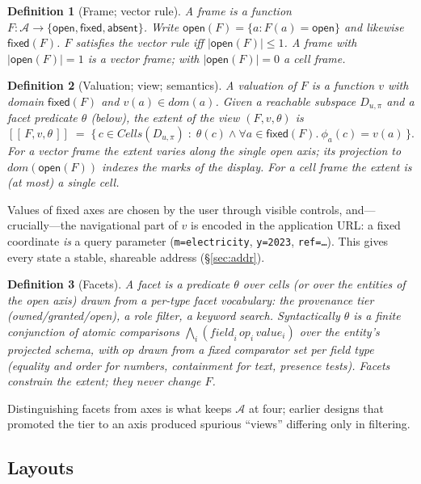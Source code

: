 \documentclass[11pt,a4paper]{article}
\newtheorem{definition}{Definition}[section]
\theoremstyle{remark}
\newcommand{\Ax}{\mathcal{A}}                    %
\newcommand{\Cells}{\mathit{Cells}}
\newcommand{\Dom}{\mathit{dom}}
\newcommand{\open}{\mathsf{open}}
\newcommand{\fixed}{\mathsf{fixed}}
\newcommand{\absent}{\mathsf{absent}}
\begin{document}
\begin{definition}[Frame; vector rule]\label{def:frame}
A \emph{frame} is a function $F : \Ax \to \{\open, \fixed, \absent\}$. Write
$\open(F) = \{a : F(a) = \open\}$ and likewise $\fixed(F)$. $F$ satisfies the
\emph{vector rule} iff $|\open(F)| \le 1$. A frame with $|\open(F)| = 1$ is a
\emph{vector frame}; with $|\open(F)| = 0$ a \emph{cell frame}.
\end{definition}

\begin{definition}[Valuation; view; semantics]\label{def:view}
A \emph{valuation} of $F$ is a function $v$ with domain $\fixed(F)$ and
$v(a) \in \Dom(a)$. Given a reachable subspace $D_{u,\pi}$ and a facet predicate
$\theta$ (below), the \emph{extent} of the view $(F, v, \theta)$ is
\[
[\![\, F, v, \theta \,]\!] \;=\;
\{\, c \in \Cells(D_{u,\pi}) \;:\; \theta(c) \wedge \forall a \in \fixed(F).\
\phi_a(c) = v(a) \,\}.
\]
For a vector frame the extent varies along the single open axis; its projection to
$\Dom(\open(F))$ indexes the \emph{marks} of the display. For a cell frame the
extent is (at most) a single cell.
\end{definition}

Values of fixed axes are chosen by the user through visible controls, and---
crucially---the navigational part of $v$ is encoded in the application URL: a fixed
coordinate \emph{is} a query parameter (\texttt{m=electricity}, \texttt{y=2023},
\texttt{ref=\ldots}). This gives every state a stable, shareable address
(\S\ref{sec:addr}).

\begin{definition}[Facets]\label{def:facets}
A \emph{facet} is a predicate $\theta$ over cells (or over the entities of the open
axis) drawn from a per-type facet vocabulary: the provenance tier
(owned/granted/open), a role filter, a keyword search. Syntactically $\theta$ is a
finite conjunction of atomic comparisons
$\bigwedge_i (\mathit{field}_i \,\mathit{op}_i\, \mathit{value}_i)$ over the
entity's projected schema, with $\mathit{op}$ drawn from a fixed comparator set
per field type (equality and order for numbers, containment for text, presence
tests). Facets constrain the extent; they never change $F$.
\end{definition}

Distinguishing facets from axes is what keeps $\Ax$ at four; earlier designs that
promoted the tier to an axis produced spurious ``views'' differing only in
filtering.

\subsection{Layouts}\label{sec:layouts}
\end{document}
